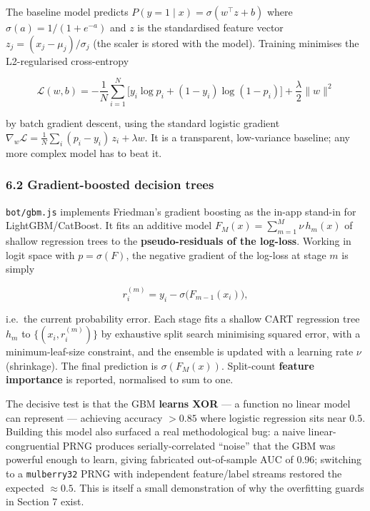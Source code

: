 \documentclass[
  11pt,
]{article}
\begin{document}
The baseline model predicts \(P(y=1\mid x) = \sigma(w^\top z + b)\)
where \(\sigma(a) = 1/(1+e^{-a})\) and \(z\) is the standardised feature
vector \(z_j = (x_j - \mu_j)/\sigma_j\) (the scaler is stored with the
model). Training minimises the L2-regularised cross-entropy

\[
\mathcal{L}(w,b) = -\frac{1}{N}\sum_{i=1}^{N}\Big[y_i\log p_i + (1-y_i)\log(1-p_i)\Big] + \frac{\lambda}{2}\lVert w\rVert^2
\]

by batch gradient descent, using the standard logistic gradient
\(\nabla_w \mathcal{L} = \tfrac{1}{N}\sum_i (p_i - y_i)\,z_i + \lambda w\).
It is a transparent, low-variance baseline; any more complex model has
to beat it.

\subsubsection{6.2 Gradient-boosted decision
trees}\label{gradient-boosted-decision-trees}

\texttt{bot/gbm.js} implements Friedman's gradient boosting as the
in-app stand-in for LightGBM/CatBoost. It fits an additive model
\(F_M(x) = \sum_{m=1}^{M}\nu\,h_m(x)\) of shallow regression trees to
the \textbf{pseudo-residuals of the log-loss}. Working in logit space
with \(p = \sigma(F)\), the negative gradient of the log-loss at stage
\(m\) is simply

\[
r_i^{(m)} = y_i - \sigma\!\big(F_{m-1}(x_i)\big),
\]

i.e.~the current probability error. Each stage fits a shallow CART
regression tree \(h_m\) to \(\{(x_i, r_i^{(m)})\}\) by exhaustive split
search minimising squared error, with a minimum-leaf-size constraint,
and the ensemble is updated with a learning rate \(\nu\) (shrinkage).
The final prediction is \(\sigma(F_M(x))\). Split-count \textbf{feature
importance} is reported, normalised to sum to one.

The decisive test is that the GBM \textbf{learns XOR} --- a function no
linear model can represent --- achieving accuracy \(>0.85\) where
logistic regression sits near \(0.5\). Building this model also surfaced
a real methodological bug: a naive linear-congruential PRNG produces
serially-correlated ``noise'' that the GBM was powerful enough to learn,
giving fabricated out-of-sample AUC of 0.96; switching to a
\texttt{mulberry32} PRNG with independent feature/label streams restored
the expected \(\approx 0.5\). This is itself a small demonstration of
why the overfitting guards in Section 7 exist.
\end{document}
